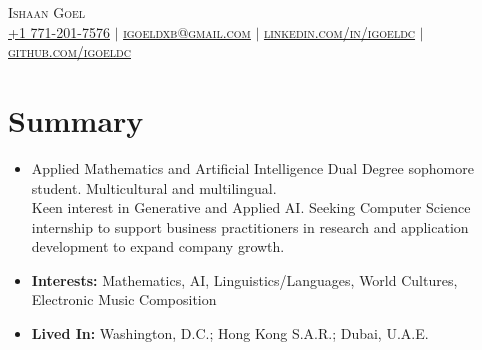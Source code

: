 \documentclass[letterpaper,10pt]{article}
\newcommand{\resumeSubHeadingListStart}{\begin{itemize}[leftmargin=0.15in, label=]}
\newcommand{\resumeSubHeadingListEnd}{\end{itemize}}
\begin{document}
\begin{center}
    \Huge \scshape Ishaan Goel \\ \vspace{2pt}
    \small
    \href{tel:17712017576}{\underline{+1 771-201-7576}}
    $|$ \href{mailto:igoeldxb@gmail.com}{\underline{igoeldxb@gmail.com}}
    $|$ \href{https://linkedin.com/in/igoeldc}{\underline{linkedin.com/in/igoeldc}}
    $|$ \href{https://github.com/igoeldc}{\underline{github.com/igoeldc}}
\end{center}

\vspace{-15px}
\section{Summary}
  \resumeSubHeadingListStart
    \item{Applied Mathematics and Artificial Intelligence Dual Degree sophomore student. Multicultural and multilingual.\\Keen interest in Generative and Applied AI. Seeking Computer Science internship to support business practitioners in research and application development to expand company growth.}\vspace{-5px}
    \item{\textbf{Interests:} Mathematics, AI, Linguistics/Languages, World Cultures, Electronic Music Composition}\vspace{-5px}
    \item{\textbf{Lived In:} Washington, D.C.; Hong Kong S.A.R.; Dubai, U.A.E.}
  \resumeSubHeadingListEnd


\newcommand{\resumeEducationHeading}[9]{
  \vspace{-2pt}\item
    \begin{tabular*}{0.97\textwidth}[t]{l@{\extracolsep{\fill}}r}
      \textbf{#1} \emph{#2} & #3 \\
      \hspace{20px}#4 & #5 \\
      \hspace{20px}#6 & #7 \\
      \hspace{20px}#8 & #9 \\
    \end{tabular*}\vspace{-7pt}
}
\end{document}
